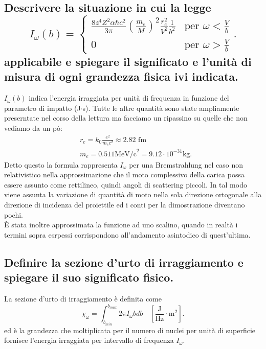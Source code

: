 \subsection[\hspace{1mm} Energia irraggiata per unità di frequenza per Bremsstralhung non relativistica]{Descrivere la situazione in cui la legge
\[
	I_{\omega}\left( b \right) = 
	\begin{cases}
		\frac{8z^4Z^2 \alpha \hbar c^2}{3\pi} \left( \frac{m_e}{M} \right) ^2 \frac{r^2_e}{V^2} \frac{1}{b ^2}  & \text{per } \omega<\frac{V}{b}\\
		0 & \text{per } \omega> \frac{V}{b}
	\end{cases}
.\] 
applicabile e spiegare il significato e l'unità di misura di ogni grandezza fisica ivi indicata.
}\label{sec:4.a.12}
$I_{\omega}\left( b \right) $ indica l'energia irraggiata per unità di frequenza in funzione del parametro di impatto (J$\cdot$s). Tutte le altre quantità sono state ampliamente preserntate nel corso della lettura ma facciamo un ripassino su quelle che non vediamo da un pò:
\begin{align*}
	&r_e = k_0 \frac{e^2}{m_e c^2} \approx 2.82 \text{ fm}\\
	&m_e = 0.511 \text{MeV/c}^2 = 9.12 \cdot 10^{-31} \text{kg}
.\end{align*}
Detto questo la formula rappresenta $I_{\omega}$ per una Bremstrahlung nel caso non relativistico nella approssimazione che il moto complessivo della carica possa essere assunto come rettilineo, quindi angoli di scattering piccoli. In tal modo viene assunta la variazione di quantità di moto nella sola direzione ortogonale alla direzione di incidenza del proiettile ed i conti per la dimostrazione diventano pochi.\\
È stata inoltre approssimata la funzione ad uno scalino, quando in realtà i termini sopra esrpessi corrispondono all'andamento asintodico di quest'ultima.

\subsection[\hspace{1mm} Sezione d'urto di irraggiamento]{Definire la sezione d'urto di irraggiamento e spiegare il suo significato fisico.
}\label{sec:4.a.13}
La sezione d'urto di irraggiamento è definita come
\[
	\chi_{\omega}= \int_{b_{min}}^{b_{max}} 2\pi I_{\omega}b db \quad \left[ \frac{\text{J}}{\text{Hz}}\cdot \text{m}^2 \right] 
.\] 
ed è la grandezza che moltiplicata per il numero di nuclei per unità di superficie fornisce l'energia irraggiata per intervallo di frequenza $I_{\omega}$.

